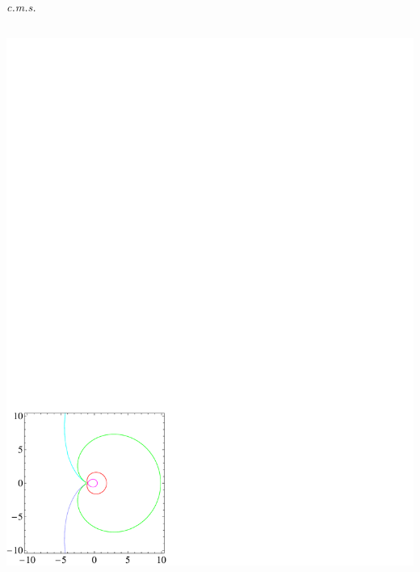 \documentclass{beamer}
\begin{document}
\begin{frame}{\it c.m.s.}

\begin{columns}
\column{2cm}

\column{20cm}
\begin{center}
\vspace{-17cm}
\includegraphics[width=18cm]{fdecays.pdf}
\end{center}

\end{columns}


\end{frame}
\end{document}
